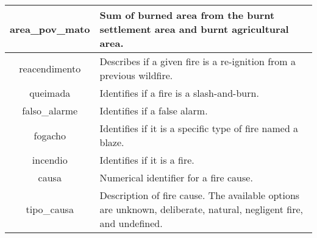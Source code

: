\begin{table}[h!]
\begin{tabular}{|c|p{7.5cm}|}
area\_pov\_mato & Sum of burned area from the burnt settlement area and burnt agricultural area.\\
\hline

reacendimento & Describes if a given fire is a re-ignition from a previous wildfire. \\
\hline
queimada & Identifies if a fire is a slash-and-burn. \\
\hline
falso\_alarme & Identifies if a false alarm. \\
\hline
fogacho & Identifies if it is a specific type of fire named a blaze. \\
\hline
incendio & Identifies if it is a fire. \\
\hline
causa & Numerical identifier for a fire cause. \\
\hline
tipo\_causa & Description of fire cause. The available options are unknown, deliberate, natural, negligent fire, and undefined. \\
\hline
\end{tabular}
\end{table}





